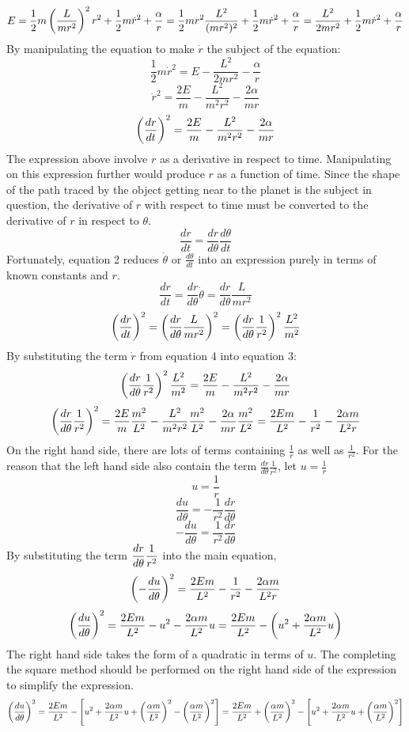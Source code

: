 \documentclass[a4paper, 12pt]{report}
\begin{document}
\begin{center}
$$E = \frac{1}{2}m\left(\frac{L}{mr^2}\right)^2r^2 + \frac{1}{2}m\dot{r}^2 +\frac{\alpha}{r} = \frac{1}{2}mr^2\frac{L^2}{(mr^2)^2} + \frac{1}{2}m\dot{r}^2 +\frac{\alpha}{r} = \frac{L^2}{2mr^2} + \frac{1}{2}m\dot{r}^2 +\frac{\alpha}{r}$$
By manipulating the equation to make $\dot{r}$ the subject of the equation:
$$\frac{1}{2}m\dot{r}^2 = E - \frac{L^2}{2mr^2} - \frac{\alpha}{r}$$
$$\dot{r}^2 = \frac{2E}{m}-\frac{L^2}{m^2r^2}-\frac{2\alpha}{mr}$$
$$\left(\frac{dr}{dt}\right)^2 =\frac{2E}{m}-\frac{L^2}{m^2r^2}-\frac{2\alpha}{mr}$$
The expression above involve $r$ as a derivative in respect to time. Manipulating on this expression further would produce $r$ as a function of time. Since the shape of the path traced by the object getting near to the planet is the subject in question, the derivative of $r$ with respect to time must be converted to the derivative of $r$ in respect to $\theta$.
$$\frac{dr}{dt} = \frac{dr}{d\theta}\frac{d\theta}{dt}$$
Fortunately, equation 2 reduces $\dot{\theta}$ or $\frac{d\theta}{dt}$ into an expression purely in terms of known constants and $r$.
$$\frac{dr}{dt} = \frac{dr}{d\theta}\dot{\theta} = \frac{dr}{d\theta}\frac{L}{mr^2}$$
$$\left(\frac{dr}{dt}\right)^2 = \left(\frac{dr}{d\theta}\frac{L}{mr^2}\right)^2 = \left(\frac{dr}{d\theta}\frac{1}{r^2}\right)^2\frac{L^2}{m^2}$$
By substituting the term $\dot{r}$ from equation 4 into equation 3:
$$\left(\frac{dr}{d\theta}\frac{1}{r^2}\right)^2\frac{L^2}{m^2}=\frac{2E}{m}-\frac{L^2}{m^2r^2}-\frac{2\alpha}{mr}$$
$$\left(\frac{dr}{d\theta}\frac{1}{r^2}\right)^2 = \frac{2E}{m}\frac{m^2}{L^2}-\frac{L^2}{m^2r^2}\frac{m^2}{L^2}-\frac{2\alpha}{mr}\frac{m^2}{L^2} = \frac{2Em}{L^2}-\frac{1}{r^2}-\frac{2\alpha m}{L^2r}$$
On the right hand side, there are lots of terms containing $\displaystyle\frac{1}{r}$ as well as $\displaystyle\frac{1}{r^2}$. For the reason that the left hand side also contain the term $\displaystyle\frac{dr}{d\theta}\frac{1}{r^2}$, let $\displaystyle u = \frac{1}{r}$
$$u = \frac{1}{r}$$
$$\frac{du}{d\theta} = -\frac{1}{r^2}\frac{dr}{d\theta}$$
$$-\frac{du}{d\theta} = \frac{1}{r^2}\frac{dr}{d\theta}$$
By substituting the term $\displaystyle{\frac{dr}{d\theta}\frac{1}{r^2}}$ into the main equation,
$$\left(-\frac{du}{d\theta}\right)^2=\frac{2Em}{L^2}-\frac{1}{r^2}-\frac{2\alpha m}{L^2r}$$
$$\left(\frac{du}{d\theta}\right)^2=\frac{2Em}{L^2}-u^2-\frac{2\alpha m}{L^2}u = \frac{2Em}{L^2}-\left(u^2+\frac{2\alpha m}{L^2}u\right)$$
The right hand side takes the form of a quadratic in terms of $u$. The completing the square method should be performed on the right hand side of the expression to simplify the expression.
$$\left(\frac{du}{d\theta}\right)^2=\frac{2Em}{L^2}-\left[u^2+\frac{2\alpha m}{L^2}u + \left(\frac{\alpha m}{L^2}\right)^2 - \left(\frac{\alpha m}{L^2}\right)^2\right] = \frac{2Em}{L^2}+ \left(\frac{\alpha m}{L^2}\right)^2-\left[u^2+\frac{2\alpha m}{L^2}u + \left(\frac{\alpha m}{L^2}\right)^2\right]$$

\end{center}
\end{document}
